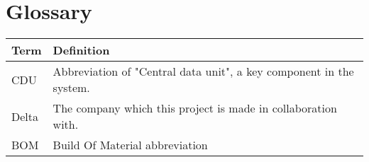 \section{Glossary}
\begin{table}[H]
\centering
\begin{tabular}{|p{4cm}|p{7cm}|}
\hline
Term & Definition\\ \hline
CDU & Abbreviation of "Central data unit", a key component in the system. \\ \hline
Delta & The company which this project is made in collaboration with.\\ \hline
BOM & Build Of Material abbreviation\\ \hline
\end{tabular}
\end{table}